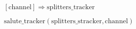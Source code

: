 \documentclass{article}
\begin{document}
\pagestyle{empty}

\newcommand{\send}{\Rightarrow}
\newcommand{\sendto}{\rightarrow}
\newcommand{\recv}{\Leftarrow}
\algrenewcommand\textproc{\textrm}

\begin{algorithmic}

  \algrenewcommand{}

  \State $[\text{channel}] \send \text{splitters\_tracker}$
  \EndFunction

  \State $\text{salute\_tracker}(\text{splitters\_stracker}, \text{channel})$
  \EndFunction
  
  \EndProcedure
\end{algorithmic}
\end{document}
